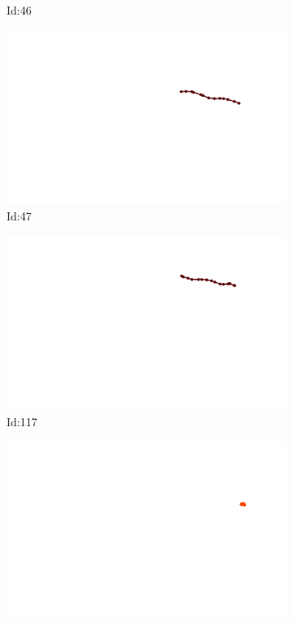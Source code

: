 \documentclass[12pt,twoside]{report}
\begin{document}
\begin{figure}
\begin{subfigure}[b]{0.20\textwidth}
\caption{Id:46}
\end{subfigure}
\begin{subfigure}[b]{0.20\textwidth}
\centering
\includegraphics[width=\textwidth]{../trajectories/47.png}
\caption{Id:47}
\end{subfigure}
\begin{subfigure}[b]{0.20\textwidth}
\centering
\includegraphics[width=\textwidth]{../trajectories/117.png}
\caption{Id:117}
\end{subfigure}
\begin{subfigure}[b]{0.20\textwidth}
\centering
\includegraphics[width=\textwidth]{../trajectories/118.png}

\end{subfigure}
\end{figure}
\end{document}
